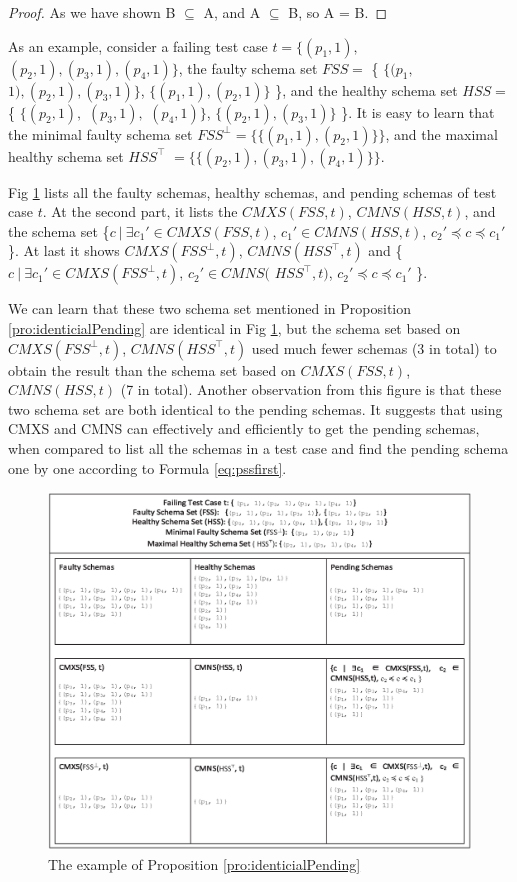 {\begin{proof}
As we have shown B $\subseteq$ A, and A $\subseteq$ B, so A = B.
\end{proof}

As an example, consider a failing test case $t = \{(p_{1}, 1),$ $ (p_{2}, 1), (p_{3}, 1), (p_{4}, 1)\}$, the faulty schema set $FSS =$ \{ $\{(p_{1}, $ $1), (p_{2}, 1), (p_{3}, 1)\}$, $\{(p_{1}, 1), (p_{2}, 1)\}$ \}, and the healthy schema set $HSS =$  \{ $\{(p_{2}, 1),$ $(p_{3}, 1),$ $(p_{4}, 1)\}$, $\{(p_{2}, 1), (p_{3}, 1)\}$ \}. It is easy to learn that the minimal faulty schema set $FSS^{\bot} = \{\{(p_{1}, 1), (p_{2}, 1)\}\}$, and the maximal healthy schema set $HSS^{\top}$ $= \{\{ (p_{2}, 1), (p_{3}, 1), (p_{4}, 1) \}\}$.

Fig \ref{fig_minmax} lists all the faulty schemas, healthy schemas, and pending schemas of test case $t$. At the second part, it lists the $CMXS(FSS, t)$, $CMNS(HSS, t)$, and the schema set \{$ c\ |\ \exists c_{1}' \in CMXS(FSS, t)$, $c_{1}' \in CMNS(HSS, t)$, $c_{2}' \preceq c \preceq c_{1}'$ \}. At last it shows $CMXS(FSS^{\bot}, t)$, $CMNS(HSS^{\top}, t)$ and  \{$ c\ |\ \exists c_{1}' \in CMXS(FSS^{\bot}, t)$, $ c_{2}' \in CMNS($ $HSS^{\top}, t)$, $c_{2}' \preceq c \preceq c_{1}'$ \}.

We can learn that these two schema set mentioned in Proposition \ref{pro:identicialPending} are identical in Fig \ref{fig_minmax}, but the schema set based on $CMXS(FSS^{\bot}, t)$, $CMNS(HSS^{\top}, t)$ used much fewer schemas (3 in total) to obtain the result than the schema set based on $CMXS(FSS, t)$, $CMNS(HSS, t)$ (7 in total). Another observation from this figure is that these two schema set are both identical to the pending schemas. It suggests that using CMXS and CMNS can effectively and efficiently to get the pending schemas, when compared to list all the schemas in a test case and find the pending schema one by one according to Formula \ref{eq:pssfirst}.

\begin{figure}[ht]
 \centering
 \includegraphics[width=5.6in]{minmax.eps}
 \caption{The example of Proposition \ref{pro:identicialPending}}
 \label{fig_minmax}
\end{figure}


}
